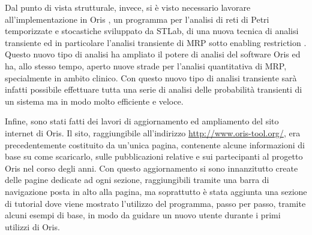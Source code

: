 \documentclass{article}
\begin{document}
    Dal punto di vista strutturale, invece, si è visto necessario lavorare all'implementazione in Oris \cite{bucci2010oris}, un programma per l'analisi di reti di Petri temporizzate e stocastiche sviluppato da STLab, di una nuova tecnica di analisi transiente ed in particolare l'analisi transiente di MRP sotto enabling restriction \cite{german1995transient}. Questo nuovo tipo di analisi ha ampliato il potere di analisi del software Oris ed ha, allo stesso tempo, aperto nuove strade per l'analisi quantitativa di MRP, specialmente in ambito clinico. Con questo nuovo tipo di analisi transiente sarà infatti possibile effettuare tutta una serie di analisi delle probabilità transienti di un sistema ma in modo molto efficiente e veloce.
    
    Infine, sono stati fatti dei lavori di aggiornamento ed ampliamento del sito internet di Oris. Il sito, raggiungibile all'indirizzo \url{http://www.oris-tool.org/}, era precedentemente costituito da un'unica pagina, contenente alcune informazioni di base su come scaricarlo, sulle pubblicazioni relative e sui partecipanti al progetto Oris nel corso degli anni. Con questo aggiornamento si sono innanzitutto create delle pagine dedicate ad ogni sezione, raggiungibili tramite una barra di navigazione posta in alto alla pagina, ma soprattutto è stata aggiunta una sezione di tutorial dove viene mostrato l'utilizzo del programma, passo per passo, tramite alcuni esempi di base, in modo da guidare un nuovo utente durante i primi utilizzi di Oris.
    
    \clearpage
    
	
	
\end{document}
